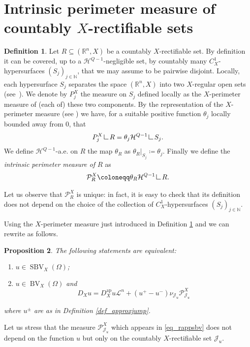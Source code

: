 \documentclass[12pt,a4paper]{amsart}
\theoremstyle{definition}
\newtheorem{defi}{Definition}[section]
\theoremstyle{plain}
\newtheorem{pro}[defi]{Proposition}
\newcommand{\N}{\mathbb{N}}
\newcommand{\R}{\mathbb{R}}
\newcommand{\se}{\subseteq}
\newcommand{\ceq}{\coloneqq}
\newcommand{\pxu}{{\mathcal{P}^X_{\mathcal{J}_u}}}
\newcommand{\res} {\mathop{\hbox{\vrule height 7pt width .5pt depth 0pt \vrule height .5pt width 6pt depth 0pt}}\nolimits}
\newcommand{\leb}{\mathcal{L}}
\newcommand{\sbv}{\operatorname{SBV}}
\newcommand{\bv}{\operatorname{BV}}
\newcommand{\J}{\mathcal{J}}
\newcommand{\hau}{\mathcal{H}}
\newcommand{\ap}{{\operatorname{ap}}}
\begin{document}
\section{Intrinsic perimeter measure of countably \texorpdfstring{$X$}{X}-rectifiable sets}\label{sec_intrper}


\begin{defi}\label{def_pxu}
Let $R \se (\R^n,X)$ be a countably $X$-rectifiable set. By definition it can be covered, up to a $\hau^{Q-1}$-negligible set, by countably many $C^1_X$-hypersurfaces $(S_j)_{j \in \N}$, that we may assume to be pairwise disjoint. Locally, each hypersurface $S_j$ separates the space $(\R^n,X)$ into two  $X$-regular open sets (see~\cite{vittone2012}). We denote by $P_j^X$ the measure on $S_j$ defined locally as the  $X$-perimeter measure of (each of) these two components. By the representation of the $X$-perimeter measure (see \cite{AmbrosioAhlfors}) we have, for a suitable positive function $\theta_j$ locally bounded away from 0, that
\[
P_j^X \res R = \theta_j \hau^{Q-1} \res S_j.
\]
We define $\hau^{Q-1}$-a.e. on $R$ the map $\theta_R$ as $\theta_R|_{S_j} \ceq \theta_j$. Finally we define the \emph{intrinsic perimeter measure of $R$} as
\[
\mathcal{P}_R^X \ceq \theta_R \hau^{Q-1} \res R.
\]

Let us observe that $\mathcal P^X_R$ is unique: in fact, it is easy to check that its definition does not depend on the choice of the collection of $C^1_X$-hypersurfaces $(S_j)_{j \in \N}$.
\end{defi}

Using the $X$-perimeter measure just introduced in Definition \ref{def_pxu} and \cite[Theorem 1.1]{dv} we can rewrite \cite[Proposition 3.3]{sbvx} as follows.
\begin{pro}\label{prop_defequivsbvx}
    The following statements are equivalent:
    \begin{enumerate}
        \item[(i)] $u\in \sbv_X(\Omega)$;
        \item[(ii)] $u\in \bv_X(\Omega)$ and  
        \begin{equation}\label{eq_rappsbv}
        D_Xu= D^\ap_Xu \leb^n+(u^+-u^-)\nu_{\J_u}\pxu
        \end{equation}
    \end{enumerate}
    where $u^\pm$ are as in Definition \ref{def_approxjump}.
\end{pro}
Let us stress that the measure $\pxu$ which appears in \eqref{eq_rappsbv} does not depend on the function $u$ but only on the countably $X$-rectifiable set $\J_u$.
\end{document}
